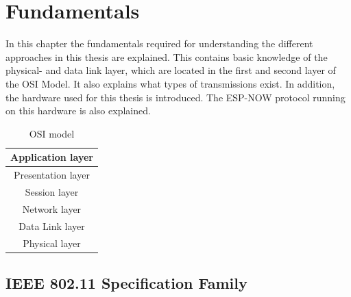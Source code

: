 \chapter{Fundamentals}
\label{sec:fundamentals}


In this chapter the fundamentals required for understanding the different approaches 
in this thesis are explained.
This contains basic knowledge of the physical- and data link layer,
which are located in the first and second layer of the \ac{OSI} Model.
It also explains what types of transmissions exist.
In addition, the hardware used for this thesis is introduced.
The ESP-NOW protocol running on this hardware is also explained.

\begin{table}[h]
	\centering
	\begin{tabular}{ |c| } 
		\hline
		Application layer\\
		\hline
		Presentation layer\\
		\hline
		Session layer\\
		\hline
		Network layer\\
		\hline
		\cellcolor{yellow!25}Data Link layer\\
		\hline
		\cellcolor{yellow!25}Physical layer\\
		\hline
	\end{tabular}
	\caption{\ac{OSI} model}
	\label{tab:OSI}
\end{table}

\section{IEEE 802.11 Specification Family}

